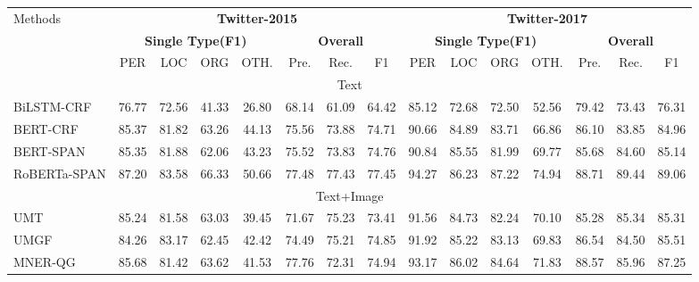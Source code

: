 \documentclass[11pt]{article}
\begin{document}
\begin{table*}[!]
\small
\setlength\tabcolsep{1.7pt}
\renewcommand{\arraystretch}{1.2}
\centering
\begin{tabular}{lcccccccccccccc}
\toprule
 \multirow{3}{*}{Methods} 
 & \multicolumn{7}{|c|}{\textbf{Twitter-2015}}  &\multicolumn{7}{c}{\textbf{Twitter-2017}}  \\\cline{2-15}
 & \multicolumn{4}{|c|}{\textbf{Single Type(F1)}} & \multicolumn{3}{c|}{\textbf{Overall}} & \multicolumn{4}{c|}{\textbf{Single Type(F1)}} & \multicolumn{3}{c}{\textbf{Overall}}\\
  &\multicolumn{1}{|c}{PER}   & LOC   & ORG  & \multicolumn{1}{c|}{OTH.}  & Pre.   & Rec.   & \multicolumn{1}{c|}{F1} & PER   & LOC   & ORG   & \multicolumn{1}{c|}{OTH.}  & Pre. &Rec. &F1   \\ 
\midrule 
 \multicolumn{15}{c}{ Text}\\
\midrule
BiLSTM-CRF &\multicolumn{1}{|c}{76.77} & 72.56 & 41.33 & \multicolumn{1}{c|}{26.80} & 68.14 & 61.09 & \multicolumn{1}{c|}{64.42} & 85.12 & 72.68 & 72.50 & \multicolumn{1}{c|}{52.56} & 79.42 & 73.43 & 76.31 \\
BERT-CRF & \multicolumn{1}{|c}{85.37} & 81.82 & 63.26 & \multicolumn{1}{c|}{44.13} & 75.56 & 73.88 & \multicolumn{1}{c|}{74.71} & 90.66 & 84.89 & 83.71 & \multicolumn{1}{c|}{66.86} & 86.10 & 83.85 & 84.96  \\
BERT-SPAN & \multicolumn{1}{|c}{85.35} & 81.88 & 62.06 & \multicolumn{1}{c|}{43.23} & 75.52 & 73.83 & \multicolumn{1}{c|}{74.76} & 90.84 & 85.55 & 81.99 & \multicolumn{1}{c|}{69.77} & 85.68 & 84.60 & 85.14 \\
RoBERTa-SPAN & \multicolumn{1}{|c}{87.20} & 83.58 & 66.33 & \multicolumn{1}{c|}{50.66} & 77.48 & 77.43 & \multicolumn{1}{c|}{77.45} & 94.27 & 86.23 & 87.22 & \multicolumn{1}{c|}{74.94} & 88.71 & 89.44 & 89.06 \\
\midrule 
\multicolumn{15}{c}{ Text+Image}\\
\midrule
UMT & \multicolumn{1}{|c}{85.24} & 81.58 &  63.03 &  \multicolumn{1}{c|}{39.45} &  71.67 &  75.23 &  \multicolumn{1}{c|}{73.41} &  91.56 &  84.73 & 82.24 &  \multicolumn{1}{c|}{70.10} &  85.28 &  85.34 & 85.31 \\
UMGF & \multicolumn{1}{|c}{84.26} & 83.17 & 62.45 &\multicolumn{1}{c|}{42.42} & 74.49 & 75.21 &  \multicolumn{1}{c|}{74.85} &  91.92 &  85.22 &  83.13 &
  \multicolumn{1}{c|}{69.83} &  86.54 &  84.50 & 85.51 \\
MNER-QG & \multicolumn{1}{|c}{85.68} &  81.42 &  63.62 &  \multicolumn{1}{c|}{41.53} &77.76 & 72.31 &  \multicolumn{1}{c|}{74.94} &  93.17 &  86.02 & 84.64 &  \multicolumn{1}{c|}{71.83} & 88.57 &  85.96 &  87.25 \\ 

\end{tabular}
\end{table*}
\end{document}
